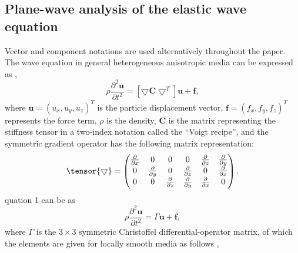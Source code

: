\subsection{Plane-wave analysis of the elastic wave equation}
Vector and component notations are used alternatively throughout the paper. The wave equation in general
 heterogeneous anisotropic media can be expressed as \cite[]{carcione:2001},
\begin{equation}
\label{eq:elastic}
\rho\frac{\partial^2\mathbf{u}}{\partial t^2} = [{\bigtriangledown}{\mathbf{C}{\bigtriangledown}^{T}}]\mathbf{u} + \mathbf{f},
\end{equation}
where $\mathbf{u}=(u_x,u_y,u_z)^{T}$ is the particle displacement vector, $\mathbf{f}=(f_x,f_y,f_z)^{T}$ represents
 the force term, $\rho$ is the density, $\mathbf{C}$ is the matrix representing the stiffness tensor in a
 two-index notation called the “Voigt recipe”, and the symmetric gradient operator has
 the following matrix representation:
\begin{equation}
\label{eq:grad}
\tensor{\bigtriangledown} =
\begin{pmatrix}\frac{\partial}{\partial x} &0 &0 &0& \frac{\partial}{\partial z} & \frac{\partial}{\partial y} \cr
0& \frac{\partial}{\partial y} &0 & \frac{\partial}{\partial z}  &0 & \frac{\partial}{\partial x} \cr
0& 0& \frac{\partial}{\partial z} & \frac{\partial}{\partial y} & \frac{\partial}{\partial x} &0 \end{pmatrix}.
\end{equation}
quation 1 can be   as
\begin{equation}
\label{eq:elastic1}
\rho\frac{\partial^2\mathbf{u}}{\partial t^2} = \Gamma\mathbf{u} + \mathbf{f},
\end{equation}
where $\Gamma$ is the $3\times3$ symmetric Christoffel differential-operator matrix, of which the elements
 are given for locally smooth media as follows \cite[]{auld:1973},
